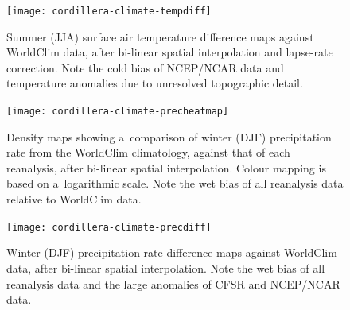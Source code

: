 \documentclass[tc, ms]{copernicus}
\begin{document}
\begin{figure}
  \texttt{[image: cordillera-climate-tempdiff]}
  \caption{Summer (JJA) surface air temperature difference maps against WorldClim data, after bi-linear spatial interpolation and lapse-rate correction. Note the cold bias of NCEP/NCAR data and temperature anomalies due to unresolved topographic detail.}
  \label{fig:tempdiff}
\end{figure}

\begin{figure}
  \texttt{[image: cordillera-climate-precheatmap]}
  \caption{Density maps showing a~comparison of winter (DJF) precipitation rate from the WorldClim climatology, against that of each reanalysis, after bi-linear spatial interpolation. Colour mapping is based on a~logarithmic scale. Note the wet bias of all reanalysis data relative to WorldClim data.}
  \label{fig:precheatmap}
\end{figure}

\begin{figure}
  \texttt{[image: cordillera-climate-precdiff]}
  \caption{Winter (DJF) precipitation rate difference maps against WorldClim data, after bi-linear spatial interpolation. Note the wet bias of all reanalysis data and the large anomalies of CFSR and NCEP/NCAR data.}
  \label{fig:precdiff}
\end{figure}
\end{document}
